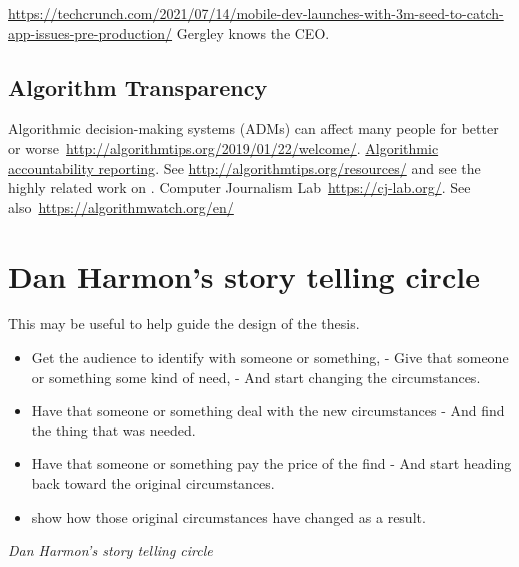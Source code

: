 \url{https://techcrunch.com/2021/07/14/mobile-dev-launches-with-3m-seed-to-catch-app-issues-pre-production/}
 Gergley knows the CEO.
 
 \subsection{Algorithm Transparency}
 
Algorithmic decision-making systems (ADMs) can affect many people for better or worse~\url{http://algorithmtips.org/2019/01/22/welcome/}. \href{http://www.nickdiakopoulos.com/wp-content/uploads/2011/07/Algorithmic-Accountability-Reporting_final.pdf}{Algorithmic accountability reporting}. See \url{http://algorithmtips.org/resources/} and see the highly related work on \href{glossary-ADMs}{} . Computer Journalism Lab~\url{https://cj-lab.org/}. See also~\url{https://algorithmwatch.org/en/}


\section{Dan Harmon's story telling circle}
This may be useful to help guide the design of the thesis.

    \begin{itemize}
        \item Get the audience to identify with someone or something, - Give that someone or something some kind of need, - And start changing the circumstances.
        \item Have that someone or something deal with the new circumstances - And find the thing that was needed.
        \item Have that someone or something pay the price of the find - And start heading back toward the original circumstances.
        \item show how those original circumstances have changed as a result.
    \end{itemize}
    \emph{Dan Harmon's story telling circle}



